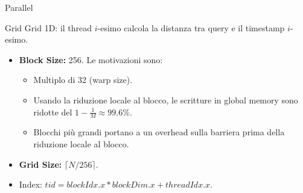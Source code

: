\begin{frame}{Parallel}
    \begin{block}{Grid}
        Grid 1D: il thread $i$-esimo calcola la distanza tra query e il timestamp $i$-esimo.
        \begin{itemize}
            \item \textbf{Block Size:} 256. Le motivazioni sono:
            \begin{itemize}
                \item Multiplo di 32 (warp size).
                \item Usando la riduzione locale al blocco, le scritture in global memory sono ridotte del $1-\tfrac{1}{M}\approx99.6\%$.
                \item Blocchi più grandi portano a un overhead sulla barriera prima della riduzione locale al blocco.
            \end{itemize}
            \item \textbf{Grid Size:} $\lceil N / 256 \rceil$.
            \item Index: $tid=blockIdx.x * blockDim.x + threadIdx.x$.
        \end{itemize}
    \end{block}
\end{frame}